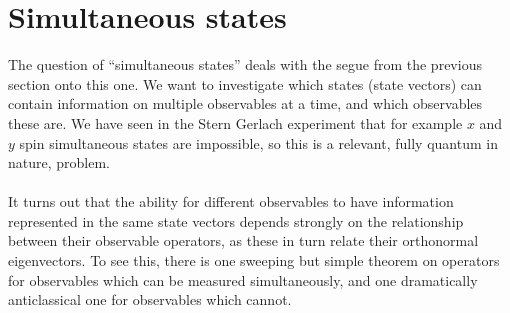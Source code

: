 \section{Simultaneous states}
The question of ``simultaneous states'' deals with the segue from the previous section onto this one. We want to investigate which states (state vectors) can contain information on multiple observables at a time, and which observables these are. We have seen in the Stern Gerlach experiment that for example $x$ and $y$ spin simultaneous states are impossible, so this is a relevant, fully quantum in nature, problem.
\\\\
It turns out that the ability for different observables to have information represented in the same state vectors depends strongly on the relationship between their observable operators, as these in turn relate their orthonormal eigenvectors. To see this, there is one sweeping but simple theorem on operators for observables which can be measured simultaneously, and one dramatically anticlassical one for observables which cannot.

